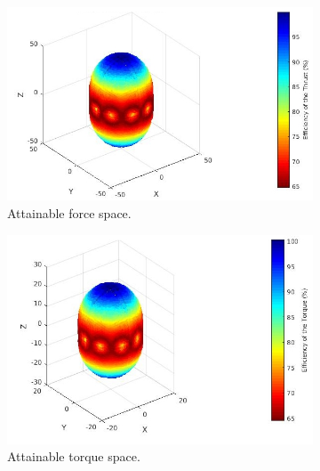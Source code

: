 \begin{figure}[!ht]
  \begin{center}
  \begin{subfigure}[b]{0.45\textwidth}
    \includegraphics[width=\linewidth]{images/Penta_standard_fspace.jpg}
    \caption{Attainable force space.} \label{fig:penta_standard_fspace}
  \end{subfigure}
  \hspace*{\fill} %
  \begin{subfigure}[b]{0.42\textwidth}
    \includegraphics[width=\linewidth]{images/Penta_standard_tspace.jpg}
    \caption{Attainable torque space.} \label{fig:penta_standard_tspace}
  \end{subfigure}
  \begin{subfigure}[b]{0.47\textwidth}

\end{subfigure}
\end{center}
\end{figure}
